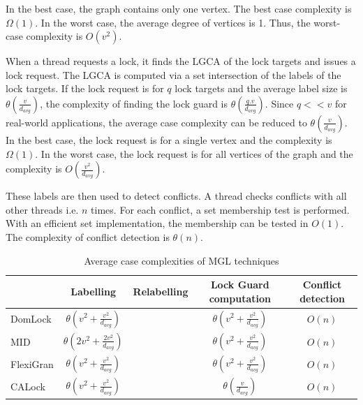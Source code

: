 In the best case, the graph contains only one vertex. The best case complexity is $\Omega(1)$.
In the worst case, the average degree of vertices is 1. Thus, the worst-case complexity is $O(v^2)$.

When a thread requests a lock, it finds the LGCA of the lock targets and issues a lock request. 
The LGCA is computed via a set intersection of the labels of the lock targets. 
If the lock request is for $q$ lock targets and the average label size is $\theta(\frac{v}{d_{avg}})$, the complexity of finding the lock guard is $\theta(\frac{q.v}{d_{avg}})$. Since $q<<v$ for real-world applications, the average case complexity can be reduced to $\theta(\frac{v}{d_{avg}})$. 
In the best case, the lock request is for a single vertex and the complexity is $\Omega(1)$. In the worst case, the lock request is for all vertices of the graph and the complexity is $O(\frac{v^2}{d_{avg}})$.


These labels are then used to detect conflicts. A thread checks conflicts with all other threads i.e. $n$ times. For each conflict, a set membership test is performed. With an efficient set implementation, the membership can be tested in $O(1)$. The complexity of conflict detection is $\theta(n)$.

\begin{table}
	\centering
	\captionsetup{justification=centering}
	\begin{tabular}{l | cccc}
				 		& Labelling 								&	Relabelling 		& Lock Guard computation 						& Conflict detection\\
						\hline
		DomLock 		& $\theta(v^2+ \frac{v^2}{d_{avg}})$ 		&					& $\theta(v^2+ \frac{v^2}{d_{avg}})$			& $O(n)$\\
		MID 			& $\theta(2v^2+ \frac{2v^2}{d_{avg}})$ 		&					& $\theta(v^2+ \frac{v^2}{d_{avg}})$ 			& $O(n)$\\
		FlexiGran 		& $\theta(v^2+ \frac{v^2}{d_{avg}})$		&					& $\theta(v^2+ \frac{v^2}{d_{avg}})$  			& $O(n)$\\
		CALock 			& $\theta(v^2+ \frac{v^2}{d_{avg}})$ 	 	&					& $\theta(\frac{v}{d_{avg}})$ 					& $O(n)$
	\end{tabular}\\
	\caption{Average case complexities of MGL techniques}
\end{table}

